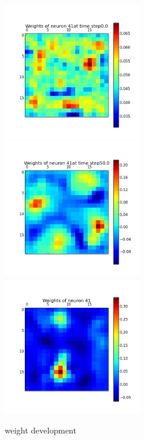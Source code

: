 \documentclass[a4paper, 12pt]{article}
\begin{document}
\begin{figure}[htbp]
\begin{minipage}[hbt]{0,49\textwidth}
        \centering
\includegraphics[width=6cm,height=6cm]{neurons/neuron_w_41_t_0.png}\\[10pt]
\includegraphics[width=6cm,height=6cm]{neurons/neuron_w_41_t_50.png} \\[10pt]
\includegraphics[width=6cm,height=6cm]{neurons/neuron_w_41.png}
        \caption{weight development}
        \label{LabelA}
\end{minipage}
\begin{minipage}[hbt]{0,49\textwidth}

\end{minipage}
\end{figure}
\end{document}
